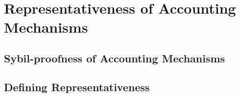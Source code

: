 \chapter{Representativeness of Accounting Mechanisms}
\label{chap:Representativeness of Accounting Mechanisms}



\section{Sybil-proofness of Accounting Mechanisms}
\label{sec:Sybil-proofness of Accounting Mechanisms}



\section{Defining Representativeness}
\label{sec:Defining Representativeness}


